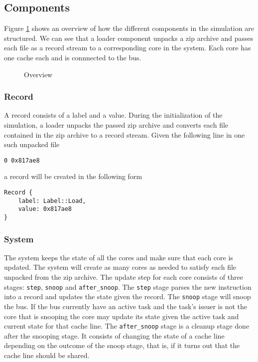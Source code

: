 
\subsection{Components}
Figure \ref{fig:overview} shows an overview of how the different components in the simulation are
structured. We can see that a loader component unpacks a zip archive and passes each file as a
record stream to a corresponding core in the system. Each core has one cache each and is connnected
to the bus.

\begin{figure}[ht]
    \centering
    \caption{Overview}
    \label{fig:overview}
\end{figure}



\subsubsection{Record}

A record consists of a label and a value.  During the initialization of the simulation, a loader
unpacks the passed zip archive and converts each file contained in the zip archive to a record
stream.  Given the following line in one such unpacked file
\begin{lstlisting}[float,floatplacement=H]
0 0x817ae8
\end{lstlisting}
a record will be created in the following form
\begin{lstlisting}[float,floatplacement=H]
Record {
    label: Label::Load,
    value: 0x817ae8
}
\end{lstlisting}


\subsubsection{System}
The system keeps the state of all the cores and make sure that each core is updated.  The system
will create as many cores as needed to satisfy each file unpacked from the zip archive.  The update
step for each core consists of three stages: \texttt{step}, \texttt{snoop} and
\texttt{after\_snoop}.  The \texttt{step} stage parses the new instruction into a record and updates
the state given the record.  The \texttt{snoop} stage will snoop the bus.  If the bus currently have
an active task and the task's issuer is not the core that is snooping the core may update its state
given the active task and current state for that cache line.  The \texttt{after\_snoop} stage is a
cleanup stage done after the snooping stage.  It consists of changing the state of a cache line
depending on the outcome of the snoop stage, that is, if it turns out that the cache line should be
shared.


